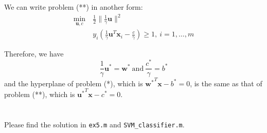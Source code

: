 \documentclass{article}[11pt]
\begin{document}
We can write problem (**) in another form:
\begin{align*}
  \min_{\mathbf{u}, c} ~& \frac{1}{2} \lVert \frac{1}{\gamma}\mathbf{u} \rVert^2 \\
  & y_i(\frac{1}{\gamma}\mathbf{u}^T \mathbf{x}_i - \frac{c}{\gamma}) \ge 1,~ i = 1, \dots, m
\end{align*}

Therefore, we have
\[ \frac{1}{\gamma}\mathbf{u}^* = \mathbf{w}^* ~\text{and}~ \frac{c^*}{\gamma} = b^* \]
and the hyperplane of problem (*), which is ${\mathbf{w}^*}^T \mathbf{x} - b^* = 0$, is the same as that of problem (**), which is  ${\mathbf{u}^*}^T \mathbf{x} - c^* = 0$.

\section{}
Please find the solution in \texttt{ex5.m} and \texttt{SVM\_classifier.m}.
\end{document}

